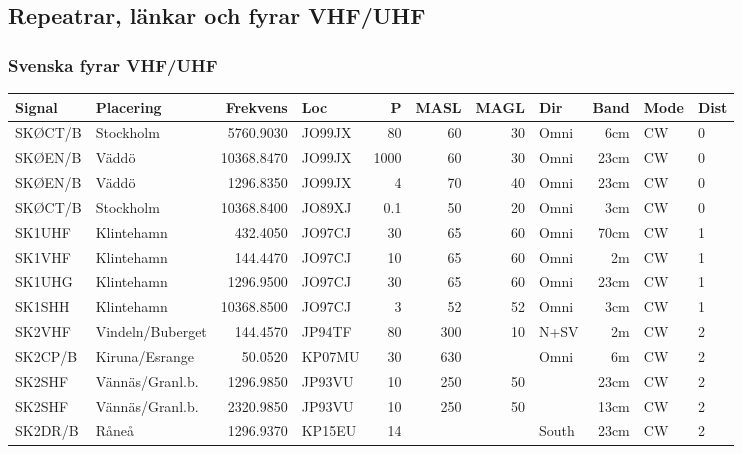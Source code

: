 \scriptsize
\subsection{Repeatrar, länkar och fyrar VHF/UHF}
\subsubsection{Svenska fyrar VHF/UHF}
\begin{longtable}{llrlrrrlrll}
	Signal   & Placering           &   Frekvens & Loc    &    P & MASL & MAGL & Dir     &  Band & Mode   & Dist \\ \hline
	SKØCT/B  & Stockholm           &  5760.9030 & JO99JX &   80 &   60 &   30 & Omni    &   6cm & CW     & 0    \\
	SKØEN/B  & Väddö               & 10368.8470 & JO99JX & 1000 &   60 &   30 & Omni    &  23cm & CW     & 0    \\
	SKØEN/B  & Väddö               &  1296.8350 & JO99JX &    4 &   70 &   40 & Omni    &  23cm & CW     & 0    \\
	SKØCT/B  & Stockholm           & 10368.8400 & JO89XJ &  0.1 &   50 &   20 & Omni    &   3cm & CW     & 0    \\
	SK1UHF   & Klintehamn          &   432.4050 & JO97CJ &   30 &   65 &   60 & Omni    &  70cm & CW     & 1    \\
	SK1VHF   & Klintehamn          &   144.4470 & JO97CJ &   10 &   65 &   60 & Omni    &    2m & CW     & 1    \\
	SK1UHG   & Klintehamn          &  1296.9500 & JO97CJ &   30 &   65 &   60 & Omni    &  23cm & CW     & 1    \\
	SK1SHH   & Klintehamn          & 10368.8500 & JO97CJ &    3 &   52 &   52 & Omni    &   3cm & CW     & 1    \\
	SK2VHF   & Vindeln/Buberget    &   144.4570 & JP94TF &   80 &  300 &   10 & N+SV    &    2m & CW     & 2    \\
	SK2CP/B  & Kiruna/Esrange      &    50.0520 & KP07MU &   30 &  630 &      & Omni    &    6m & CW     & 2    \\
	SK2SHF   & Vännäs/Granl.b.     &  1296.9850 & JP93VU &   10 &  250 &   50 &         &  23cm & CW     & 2    \\
	SK2SHF   & Vännäs/Granl.b.     &  2320.9850 & JP93VU &   10 &  250 &   50 &         &  13cm & CW     & 2    \\
	SK2DR/B  & Råneå               &  1296.9370 & KP15EU &   14 &      &      & South   &  23cm & CW     & 2    \\

\end{longtable}
